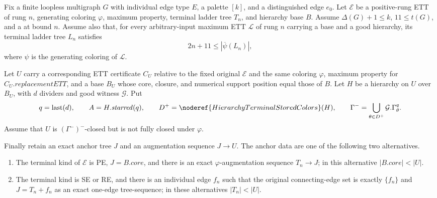 \begin{theorem}
Fix a finite loopless multigraph $G$ with individual edge type $E$, a
palette $[k]$, and a distinguished edge $e_0$.  Let $\mathcal E$ be a
positive-rung ETT of rung $n$, generating coloring $\varphi$, maximum
property, terminal ladder tree $T_n$, and hierarchy base $B$.  Assume
$\Delta(G)+1\leq k$, $11\leq t(G)$, and a
 at bound $n$.  Assume also that, for
every arbitrary-input maximum ETT $\mathcal L$ of rung $n$ carrying a
base and a good hierarchy, its terminal ladder tree $L_n$ satisfies
\[
                 2n+11\leq |\overline\psi(L_n)|,
\]
where $\psi$ is the generating coloring of $\mathcal L$.

Let $U$ carry a corresponding ETT certificate $C_U$ relative to the
fixed original $\mathcal E$ and the same coloring $\varphi$, maximum
property for $C_U.\mathit{replacementETT}$, and a base $B_U$ whose core,
closure, and numerical support position equal those of $B$.  Let $H$ be
a hierarchy on $U$ over $B_U$, with $d$ dividers and good witness
$\mathcal G$.  Put
\[
 q=\operatorname{last}(d),\qquad
 A=H.\mathit{starred}(q),\qquad
 D^+=\noderef{HierarchyTerminalStoredColors}(H),\qquad
 \Gamma^- =\bigcup_{\theta\in D^+}\mathcal G.\Gamma^q_\theta.
\]
Assume that $U$ is $(\Gamma^-)^-$-closed but is not fully closed under
$\varphi$.

Finally retain an exact anchor tree $J$ and an augmentation sequence
$J\longrightarrow U$.  The anchor data are one of the following two
alternatives.
\begin{enumerate}
\item The terminal kind of $\mathcal E$ is PE, $J=B.\mathit{core}$,
and there is an exact $\varphi$-augmentation sequence
$T_n\longrightarrow J$; in this alternative
$|B.\mathit{core}|<|U|$.
\item The terminal kind is SE or RE, and there is an individual edge
$f_n$ such that the original connecting-edge set is exactly $\{f_n\}$
and $J=T_n+f_n$ as an exact one-edge tree-sequence; in these alternatives
$|T_n|<|U|$.
\end{enumerate}


\end{theorem}
